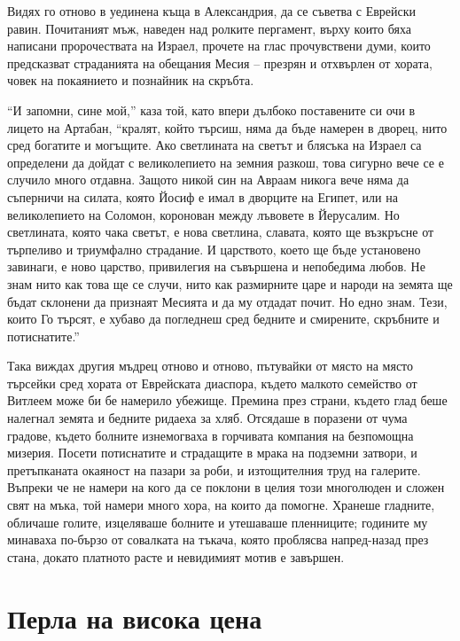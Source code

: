 \documentclass[oneside,10pt]{memoir}
\begin{document}
Видях го отново в уединена къща в Александрия, да се съветва с Еврейски равин.
Почитаният мъж, наведен над ролките пергамент, върху които бяха написани
пророчествата на Израел, прочете на глас прочувствени думи, които предсказват
страданията на обещания Месия -- презрян и отхвърлен от хората, човек на
покаянието и познайник на скръбта.

``И запомни, сине мой,'' каза той, като впери дълбоко поставените си очи в
лицето на Артабан, ``кралят, който търсиш, няма да бъде намерен в дворец, нито
сред богатите и могъщите. Ако светлината на светът и блясъка на Израел са
определени да дойдат с великолепието на земния разкош, това сигурно вече се е
случило много отдавна. Защото никой син на Авраам никога вече няма да
съперничи на силата, която Йосиф е имал в дворците на Египет, или на
великолепието на Соломон, коронован между лъвовете в Йерусалим. Но светлината,
която чака светът, е нова светлина, славата, която ще възкръсне от търпеливо
и триумфално страдание. И царството, което ще бъде установено завинаги, е ново
царство, привилегия на съвършена и непобедима любов. Не знам нито как това ще се
случи, нито как размирните царе и народи на земята ще бъдат склонени да признаят
Месията и да му отдадат почит. Но едно знам. Тези, които Го търсят, е хубаво да
погледнеш сред бедните и смирените, скръбните и потиснатите.''

Така виждах другия мъдрец отново и отново, пътувайки от място на място търсейки
сред хората от Еврейската диаспора, където малкото семейство от Витлеем може би
бе намерило убежище. Премина през страни, където глад беше налегнал земята и
бедните ридаеха за хляб. Отсядаше в поразени от чума градове, където болните
изнемогваха в горчивата компания на безпомощна мизерия. Посети потиснатите и
страдащите в мрака на подземни затвори, и претъпканата окаяност на пазари за
роби, и изтощителния труд на галерите. Въпреки че не намери на кого да се
поклони в целия този многолюден и сложен свят на мъка, той намери много хора, на
които да помогне. Хранеше гладните, обличаше голите, изцеляваше болните и
утешаваше пленниците; годините му минаваха по-бързо от совалката на тъкача,
която проблясва напред-назад през стана, докато платното расте и невидимият
мотив е завършен.

\part{Перла на висока цена}
\end{document}
